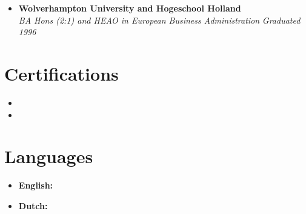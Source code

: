 \documentclass[11pt,a4paper]{article}
\begin{document}
\begin{itemize}[leftmargin=0pt,label={},itemsep=2em]
\begin{itemize}[leftmargin=0pt,label={},itemsep=2em]
\item \textbf{Wolverhampton University and Hogeschool Holland}\\
\textit{BA Hons (2:1) and HEAO in European Business Administration} \hfill \textit{Graduated 1996}
\end{itemize}

\section{Certifications}
\begin{itemize}[leftmargin=*]
\item \CertMicrosoft
\item \CertDutch
\end{itemize}

\section{Languages}
\begin{itemize}[leftmargin=*]
\item \textbf{English:} \LangEnglish
\item \textbf{Dutch:} \LangDutch
\end{itemize}

\end{itemize}
\end{document}
